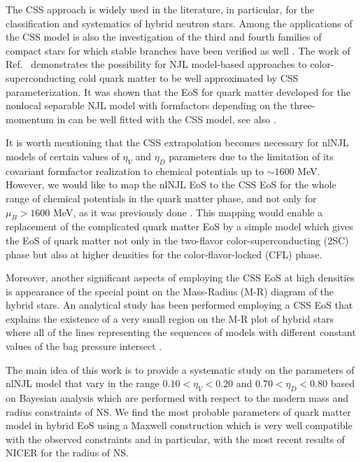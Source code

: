 \documentclass[%
 reprint,
superscriptaddress,
nofootinbib,
 amsmath,amssymb,
 aps,
]{revtex4-1}
\begin{document}
The CSS approach is widely used in the literature, in particular, for the classification \cite{Alford:2013aca} and systematics \cite{Blaschke:2020vuy, Miao:2020yjk} of hybrid neutron stars. Among the applications of the CSS model is also the investigation of the third and fourth families of compact stars for which stable branches have been verified as well  \cite{Paschalidis:2017qmb, Alford:2017qgh,Li:2019fqe}. The work of Ref.~\cite{Zdunik:2012dj} demonstrates the possibility for NJL model-based approaches to color-superconducting cold quark matter to be well approximated by CSS parameterization. It was shown that the EoS for quark matter developed for the nonlocal separable NJL model with formfactors depending on the three-momentum in \cite{Blaschke:2005uj,Blaschke:2010vd} can be well fitted with the CSS model, see also \cite{Contrera:2022tqh}.

It is worth mentioning that the CSS extrapolation becomes necessary for nlNJL models of certain values of $\eta_V$ and $\eta_D$ parameters due to the limitation of its covariant formfactor realization \cite{GomezDumm:2005hy} to chemical potentials up to $\sim 1600$ MeV. 
However, we would like to map the nlNJL EoS to the CSS EoS for the whole range of chemical potentials in the quark matter phase, and not only for $\mu_B > 1600$ MeV, as it was previously done \cite{ayriyan2021bayesian}. 
This mapping would enable a replacement of the complicated quark matter EoS by a simple model which gives the EoS of quark matter not only in the two-flavor color-superconducting (2SC) phase but also at higher densities for the color-flavor-locked (CFL) phase. 

{Moreover, another significant aspects of employing the CSS EoS at high densities is appearance of the special point on the Mass-Radius (M-R) diagram of the hybrid stars. An analytical study has been performed employing a CSS EoS that explains the existence of a very small region on the 
M-R plot of hybrid stars where all of the lines representing the sequences of models with different constant values of the bag pressure intersect \cite{Yudin:2014mla}.}

The main idea of this work is to provide a 
systematic study on the parameters of nlNJL model that vary in the range $0.10 < \eta_V < 0.20$ and $0.70 < \eta_D < 0.80$ based on Bayesian analysis which are performed with respect to the modern mass and radius constraints of NS. We find the most probable parameters of quark matter model in hybrid EoS using a Maxwell construction which is very well compatible with the observed constraints and in particular, with the most recent results of NICER for the radius of NS. 
\end{document}
